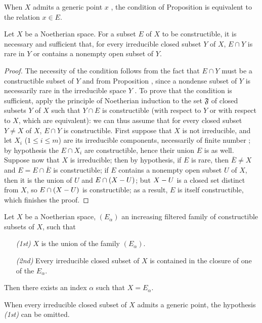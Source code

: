 When $X$ admits a generic point $x$ , the condition of Proposition  is equivalent to the relation $x\in E$.

\begin{proposition}[9.2.3]
\label{0.9.2.3}
Let $X$ be a Noetherian space.
For a subset $E$ of $X$ to be constructible, it is necessary and sufficient that, for every irreducible closed subset $Y$ of $X$, $E\cap Y$ is rare in $Y$ or contains a nonempty open subset of $Y$.
\end{proposition}

\begin{proof}
The necessity of the condition follows from the fact that $E\cap Y$ must be a constructible subset of $Y$ and from Proposition , since a nondense subset of $Y$ is necessarily rare in the irreducible space $Y$ .
To prove that the condition is sufficient, apply the principle of Noetherian induction  to the set $\mathfrak{F}$ of closed subsets $Y$ of $X$ such that $Y\cap E$ is constructible (with respect to $Y$ or with respect to $X$, which are equivalent): we can thus assume that for every closed subset $Y\neq X$ of $X$, $E\cap Y$ is constructible.
First suppose that $X$ is not irreducible, and let $X_i$ ($1\leq i\leq m$) are its irreducible components, necessarily of finite number ; by hypothesis the $E\cap X_i$ are constructible, hence their union $E$ is as well.
Suppose now that $X$ is irreducible; then by hypothesis, if $E$ is rare, then $\overline{E}\neq X$ and $E=E\cap\overline{E}$ is constructible; if $E$ contains a nonempty open subset $U$ of $X$, then it is the union of $U$ and $E\cap(X- U)$; but $X- U$ is a closed set distinct from $X$, so $E\cap(X- U)$ is constructible; as a result, $E$ is itself constructible, which finishes the proof.
\end{proof}

\begin{corollary}[9.2.4]
\label{0.9.2.4}
Let $X$ be a Noetherian space, $(E_\alpha)$ an increasing filtered family of constructible subsets of $X$, such that
\begin{enumerate}
  \item[\emph{(1st)}] $X$ is the union of the family $(E_\alpha)$.
  \item[\emph{(2nd)}] Every irreducible closed subset of $X$ is contained in the closure of one of the $E_\alpha$.
\end{enumerate}

Then there exists an index $\alpha$ such that $X=E_\alpha$.

When every irreducible closed subset of $X$ admits a generic point, the hypothesis \emph{(1st)} can be omitted.
\end{corollary}

